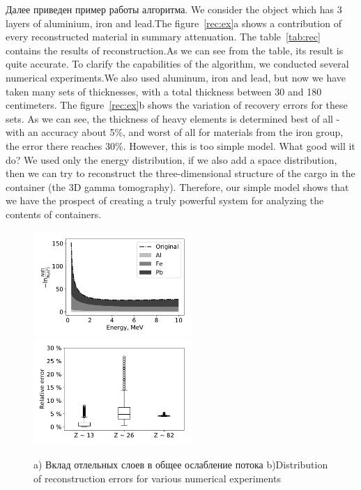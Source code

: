 \documentclass[a4paper]{panl}
\begin{document}
Далее приведен пример работы алгоритма. We consider the object which has 3 layers of aluminium, iron and lead.The figure~\ref{rec:ex}a shows a contribution of every reconstructed material in summary attenuation. The table~\ref{tab:rec} contains the results of reconstruction.As we can see from the table, its result is quite accurate. To clarify the capabilities of the algorithm, we conducted several numerical experiments.We also used aluminum, iron and lead, but now we have taken many sets of thicknesses, with a total thickness between 30 and 180 centimeters. The figure~\ref{rec:ex}b shows the variation of recovery errors for these sets. As we can see, the thickness of heavy elements is determined best of all - with an accuracy about 5\%, and worst of all for materials from the iron group, the error there reaches 30\%. However, this is too simple model. What good will it do? We used only the energy distribution, if we also add a space distribution, then we can try to reconstruct the three-dimensional structure of the cargo in the container (the 3D gamma tomography). Therefore, our simple model shows that we have the prospect of creating a truly powerful system for analyzing the contents of containers.
\begin{figure}[t]
    \begin{center}
        \includegraphics[width=60mm]{figures/reconstruction.pdf} 
        \includegraphics[width=60mm]{figures/relError.pdf}  
        \vspace{-3mm}
        \caption{a) Вклад отлельных слоев в общее ослабление потока b)Distribution of reconstruction errors for various numerical experiments}
    \end{center}
    \vspace{-5mm}
\end{figure}
\end{document}
